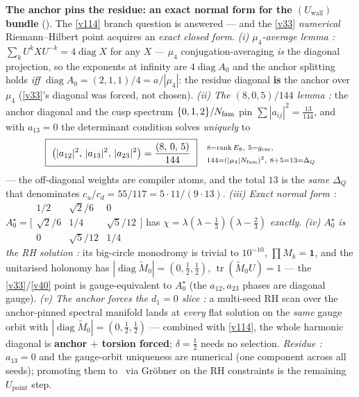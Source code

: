\par\smallskip\noindent\textbf{The anchor pins the residue: an exact normal form for the $(U_{\mathrm{wall}})$ bundle} (\mE).
The \vref{v114} branch question is answered --- and the \vref{v33} \emph{numerical} Riemann--Hilbert point acquires an
\emph{exact closed form}. \emph{(i) $\mu_4$-average lemma \mE:} $\sum_kU^kXU^{-k}=4\operatorname{diag}X$
for any $X$ --- $\mu_4$ conjugation-averaging \emph{is} the diagonal projection, so the exponents at
infinity are $4\operatorname{diag}A_0$ and the anchor splitting holds \emph{iff}
$\operatorname{diag}A_0=(2,1,1)/4=a/|\mu_4|$: the residue diagonal \textbf{is} the anchor over $\mu_4$
(\vref{v33}'s diagonal was forced, not chosen). \emph{(ii) The $(8,0,5)/144$ lemma \mE:} the anchor diagonal
and the cusp spectrum $\{0,1,2\}/N_{\mathrm{fam}}$ pin $\sum|a_{ij}|^2=\tfrac{13}{144}$, and with $a_{13}=0$ the
determinant condition solves \emph{uniquely} to
\[
  \boxed{\ \bigl(|a_{12}|^2,\,|a_{13}|^2,\,|a_{23}|^2\bigr)=\frac{(8,\,0,\,5)}{144}\ }
  \quad\begin{aligned}
  &\scriptstyle 8=\operatorname{rank}E_8,\ 5=\gcar,\\[-2pt]
  &\scriptstyle 144=(|\mu_4|\Nfam)^2,\ 8+5=13=\Delta_Q
  \end{aligned}
\]
--- the off-diagonal weights are compiler atoms, and the total $13$ is the \emph{same} $\Delta_Q$ that
denominates $c_u/c_d=55/117=5\cdot11/(9\cdot13)$. \emph{(iii) Exact normal form \mE:}
$A_0^\star=\bigl[\begin{smallmatrix}1/2&\sqrt2/6&0\\\sqrt2/6&1/4&\sqrt5/12\\0&\sqrt5/12&1/4\end{smallmatrix}\bigr]$
has $\chi=\lambda(\lambda-\tfrac13)(\lambda-\tfrac23)$ \emph{exactly}. \emph{(iv) $A_0^\star$ is the RH
solution \mE:} its big-circle monodromy is trivial to $10^{-10}$, $\prod M_k=\mathbf1$, and the
unitarised holonomy has $|\operatorname{diag}\widetilde M_0|=(0,\tfrac12,\tfrac12)$,
$\operatorname{tr}(\widetilde M_0U)=1$ --- the \vref{v33}/\vref{v40} point is gauge-equivalent to $A_0^\star$ (the
$a_{12},a_{23}$ phases are diagonal gauge). \emph{(v) The anchor forces the $d_1=0$ slice \mE:} a
multi-seed RH scan over the anchor-pinned spectral manifold lands at \emph{every} flat solution on the
\emph{same} gauge orbit with $|\operatorname{diag}\widetilde M_0|=(0,\tfrac12,\tfrac12)$ --- combined
with \vref{v114}, the whole harmonic diagonal is \textbf{anchor $+$ torsion forced}; $\delta=\tfrac12$ needs no
selection. \emph{Residue \mC:} $a_{13}=0$ and the gauge-orbit uniqueness are numerical (one component
across all seeds); promoting them to \mE\ via Gr\"obner on the RH constraints is the remaining
$U_{\mathrm{point}}$ step. 


